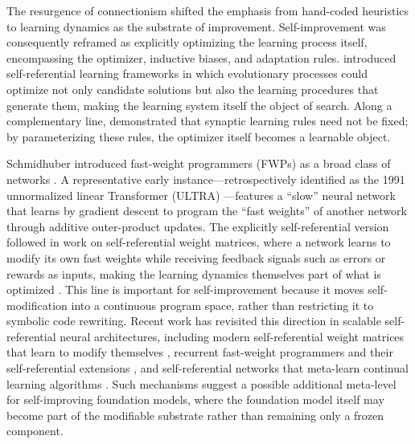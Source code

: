 The resurgence of connectionism shifted the emphasis from hand-coded heuristics to learning dynamics as the substrate of improvement. 
Self-improvement was consequently reframed as explicitly optimizing the learning process itself, encompassing the optimizer, inductive biases, and adaptation rules. \citet{schmidhuber1987selfreferential} introduced self-referential learning frameworks in which evolutionary processes could optimize not only candidate solutions but also the learning procedures that generate them, making the learning system itself the object of search. Along a complementary line, \citet{bengio1990learning}  demonstrated that synaptic learning rules need not be fixed; by parameterizing these rules, the optimizer itself becomes a learnable object.




Schmidhuber introduced fast-weight programmers (FWPs) as a broad class of networks \citep{Schmidhuber:91fastweights, schmidhuber1992learning, schmidhuber1993self}. A representative early instance—retrospectively identified as the 1991 unnormalized linear Transformer (ULTRA) \citep{schlag2021linear}—features a “slow” neural network that learns by gradient descent to program the “fast weights” of another network through additive outer-product updates. The explicitly self-referential version followed in work on self-referential weight matrices, where a network learns to modify its own fast weights while receiving feedback signals such as errors or rewards as inputs, making the learning dynamics themselves part of what is optimized \citep{schmidhuber1993self}. This line is important for self-improvement because it moves self-modification into a continuous program space, rather than restricting it to symbolic code rewriting. Recent work has revisited this direction in scalable self-referential neural architectures, including modern self-referential weight matrices that learn to modify themselves \citep{irie2022modern}, recurrent fast-weight programmers and their self-referential extensions \citep{irie2023practicalcomputationalpowerlinear, irie2021goinglineartransformersrecurrent}, and self-referential networks that meta-learn continual learning algorithms \citep{irie2025metalearningcontinuallearningalgorithms}. Such mechanisms suggest a possible additional meta-level for self-improving foundation models, where the foundation model itself may become part of the modifiable substrate rather than remaining only a frozen component.


